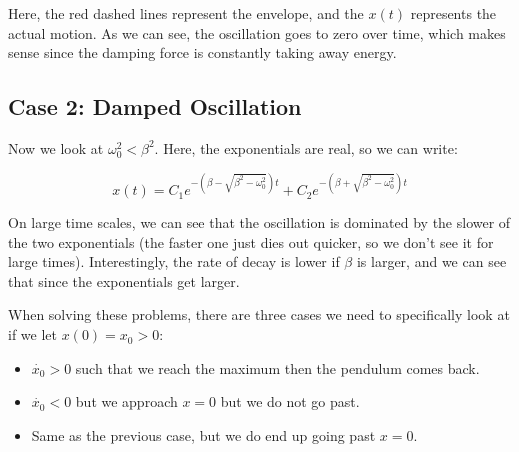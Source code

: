\begin{center}
\end{center}

Here, the red dashed lines represent the envelope, and the $x(t)$ represents the actual motion. As we can see, the oscillation goes to zero over time, which makes sense since the damping force is constantly taking away energy. 

\subsection{Case 2: Damped Oscillation}

Now we look at $\omega_0^2 < \beta^2$. Here, the exponentials are real, so we can write:

\[ x(t) = C_1e^{-(\beta - \sqrt{\beta^2 - \omega_0^2})t} + C_2 e^{-(\beta + \sqrt{\beta^2 - \omega_0^2})t}\] 

On large time scales, we can see that the oscillation is dominated by the slower of the two exponentials (the faster one just dies out quicker, so we don't see it for large times). Interestingly, the rate of decay is lower if $\beta$ is larger, and we can see that since the exponentials get larger. 

When solving these problems, there are three cases we need to specifically look at if we let $x(0) = x_0 > 0$: 

\begin{itemize}
    \item $\dot{x_0} > 0$ such that we reach the maximum then the pendulum comes back.
    \item $\dot{x_0} < 0$ but we approach $x = 0$ but we do not go past. 
    \item Same as the previous case, but we do end up going past $x = 0$.
\end{itemize}

